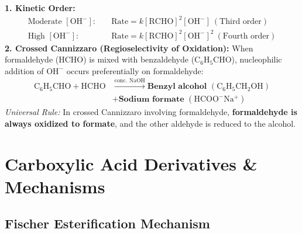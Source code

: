 \documentclass[10pt,twoside,openright]{book}
\begin{document}
\begin{formulabox}
\textbf{1. Kinetic Order:}
\begin{align*}
  \text{Moderate } [\mathrm{OH^-}]: \quad & \text{Rate} = k[\mathrm{RCHO}]^2[\mathrm{OH^-}] \ (\text{Third order})\\
  \text{High } [\mathrm{OH^-}]: \quad & \text{Rate} = k[\mathrm{RCHO}]^2[\mathrm{OH^-}]^2 \ (\text{Fourth order})
\end{align*}
\textbf{2. Crossed Cannizzaro (Regioselectivity of Oxidation):}
When formaldehyde ($\mathrm{HCHO}$) is mixed with benzaldehyde ($\mathrm{C_6H_5CHO}$), nucleophilic addition of $\mathrm{OH^-}$ occurs preferentially on formaldehyde:
\begin{align}
  \mathrm{C_6H_5CHO} + \mathrm{HCHO} &\xrightarrow{\text{conc. } \mathrm{NaOH}} \textbf{Benzyl alcohol } (\mathrm{C_6H_5CH_2OH}) \\
  &+ \textbf{Sodium formate } (\mathrm{HCOO^-Na^+})
\end{align}
\textit{Universal Rule:} In crossed Cannizzaro involving formaldehyde, \textbf{formaldehyde is always oxidized to formate}, and the other aldehyde is reduced to the alcohol.
\end{formulabox}

\newpage
\section{Carboxylic Acid Derivatives \& Mechanisms}

\subsection{Fischer Esterification Mechanism}
\end{document}
